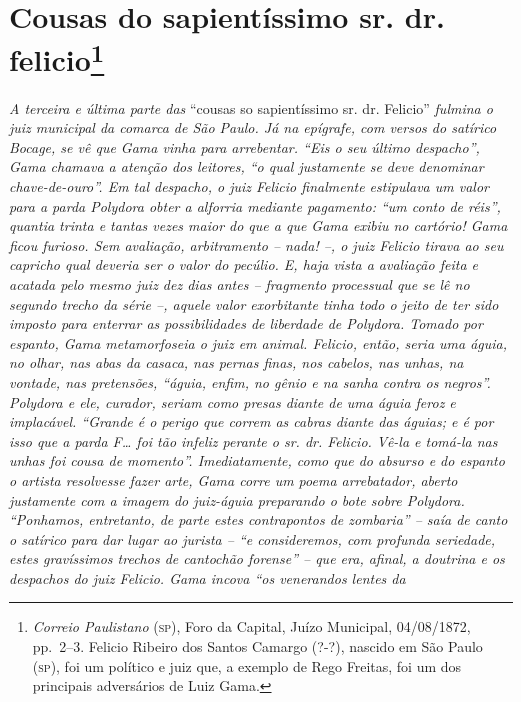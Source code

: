 \chapter{Cousas do sapientíssimo sr. dr. felicio\footnote{\emph{Correio Paulistano} (\textsc{sp}), Foro da Capital, Juízo
  Municipal, 04/08/1872, pp.~2--3. Felicio Ribeiro dos Santos Camargo
  (?-?), nascido em São Paulo (\textsc{sp}), foi um político e juiz que, a
  exemplo de Rego Freitas, foi um dos principais adversários de Luiz
  Gama.}} %

\begin{didascalia}
\emph{A terceira e última parte das} ``cousas so sapientíssimo sr. dr.
Felicio'' \emph{fulmina o juiz municipal da comarca de São Paulo. Já na
epígrafe, com versos do satírico Bocage, se vê que Gama vinha para
arrebentar. ``Eis o seu último despacho'', Gama chamava a atenção dos
leitores, ``o qual justamente se deve denominar chave-de-ouro''. Em tal
despacho, o juiz Felicio finalmente estipulava um valor para a parda
Polydora obter a alforria mediante pagamento: ``um conto de réis'',
quantia trinta e tantas vezes maior do que a que Gama exibiu no
cartório! Gama ficou furioso. Sem avaliação, arbitramento -- nada! --, o
juiz Felicio tirava ao seu capricho qual deveria ser o valor do pecúlio.
E, haja vista a avaliação feita e acatada pelo mesmo juiz dez dias antes
-- fragmento processual que se lê no segundo trecho da série --, aquele
valor exorbitante tinha todo o jeito de ter sido imposto para enterrar
as possibilidades de liberdade de Polydora. Tomado por espanto, Gama
metamorfoseia o juiz em animal. Felicio, então, seria uma águia, no
olhar, nas abas da casaca, nas pernas finas, nos cabelos, nas unhas, na
vontade, nas pretensões, ``águia, enfim, no gênio e na sanha contra os
negros''. Polydora e ele, curador, seriam como presas diante de uma águia
feroz e implacável. ``Grande é o perigo que correm as cabras diante das
águias; e é por isso que a parda F\ldots{} foi tão infeliz perante o sr. dr.
Felicio. Vê-la e tomá-la nas unhas foi cousa de momento''. Imediatamente,
como que do absurso e do espanto o artista resolvesse fazer arte, Gama
corre um poema arrebatador, aberto justamente com a imagem do juiz-águia
preparando o bote sobre Polydora. ``Ponhamos, entretanto, de parte estes
contrapontos de zombaria'' -- saía de canto o satírico para dar lugar ao
jurista -- ``e consideremos, com profunda seriedade, estes gravíssimos
trechos de cantochão forense'' -- que era, afinal, a doutrina e os
despachos do juiz Felicio. Gama incova ``os venerandos lentes da
}
\end{didascalia}
